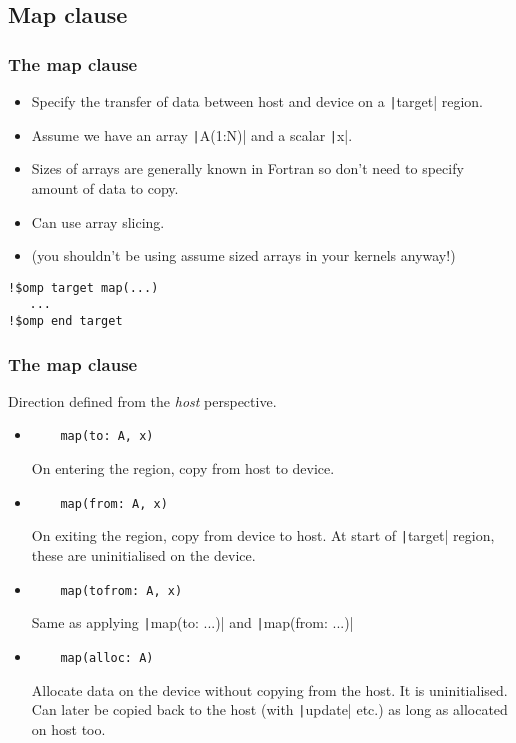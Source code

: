 \documentclass[aspectratio=169]{beamer}
\begin{document}
\subsection{Map clause}
\begin{frame}[fragile]
\frametitle{The map clause}
\begin{itemize}
  \item Specify the transfer of data between host and device on a \texttt|target| region.

\vfill

  \item Assume we have an array \texttt|A(1:N)| and a scalar \texttt|x|.
  \item Sizes of arrays are generally known in Fortran so don't need to specify amount of data to copy.
  \item Can use array slicing.%
  \item (you shouldn't be using assume sized arrays in your kernels anyway!)
\end{itemize}

\begin{verbatim}
!$omp target map(...)
   ...
!$omp end target
\end{verbatim}

\end{frame}

\begin{frame}[fragile]
\frametitle{The map clause}
Direction defined from the \emph{host} perspective.
\begin{itemize}
  \item
    \begin{verbatim}
    map(to: A, x)
    \end{verbatim}
    On entering the region, copy from host to device.

  \item
    \begin{verbatim}
    map(from: A, x)
    \end{verbatim}
    On exiting the region, copy from device to host. At start of \texttt|target| region, these are uninitialised on the device.

  \item
    \begin{verbatim}
    map(tofrom: A, x)
    \end{verbatim}
    Same as applying \texttt|map(to: ...)| and \texttt|map(from: ...)|

  \item
    \begin{verbatim}
    map(alloc: A)
    \end{verbatim}
    Allocate data on the device without copying from the host. It is uninitialised.
    Can later be copied back to the host (with \texttt|update| etc.) as long as allocated on host too.
\end{itemize}
\end{frame}
\end{document}
